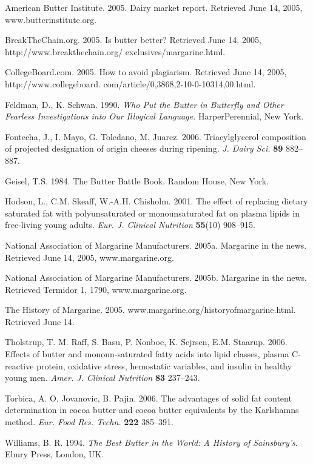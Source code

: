 \documentclass[mnsc,blindrev]{informs3} %
\begin{document}


\begin{thebibliography}{}

American Butter Institute. 2005. Dairy market report. Retrieved June
14, 2005, www.butterinstitute.org.

BreakTheChain.org. 2005. Is butter better? Retrieved June 14, 2005,
http://www.breakthechain.org/ exclusives/margarine.html.

CollegeBoard.com. 2005.  How to avoid plagiarism. Retrieved June 14,
2005,
http://www.collegeboard. com/article/0,3868,2-10-0-10314,00.html.

Feldman, D., K. Schwan. 1990. {\it Who Put the Butter in Butterfly
and Other Fearless Investigations into Our Illogical Language.}
HarperPerennial, New York.

Fontecha, J., I. Mayo, G. Toledano, M. Juarez. 2006. 
Triacylglycerol composition  of projected designation
of origin cheeses during ripening. {\it J. Dairy Sci.} {\bf 89} 882--887.

Geisel, T.S. 1984. The Butter Battle Book.  Random House, New York.

Hodson, L., C.M. Skeaff, W.-A.H. Chisholm. 2001. The effect of
replacing dietary saturated fat with polyunsaturated or
monounsaturated fat on plasma lipids in free-living young adults.
{\it Eur. J. Clinical Nutrition} {\bf 55}(10) 908--915.

National Association of Margarine Manufacturers. 2005a. Margarine in
the news. Retrieved June 14, 2005, www.margarine.org. 

National Association of Margarine Manufacturers. 2005b. Margarine in
the news. Retrieved Termidor 1, 1790, www.margarine.org.

The History of Margarine. 2005. www.margarine.org/historyofmargarine.html. Retrieved June 14. 

 Tholstrup, T. M. Raff, S. Basu, P. Nonboe, K. Sejrsen, E.M.
Staarup. 2006. Effects of butter and monoun-saturated fatty acids
into lipid classes, plasma C-reactive protein, oxidative stress,
hemostatic variables, and insulin in healthy young men. {\it Amer. J.
Clinical Nutrition} {\bf 83} 237--243.

Torbica, A. O. Jovanovic, B. Pajin. 2006. The advantages of solid
fat content determination in cocoa butter and cocoa butter
equivalents by the Karlshamns method. {\it Eur. Food Res. Techn.} {\bf 222}
385--391.

Williams, B. R. 1994. {\it The Best Butter in the World: A History of
Sainsbury's}. Ebury Press, London, UK.


\end{thebibliography}
\end{document}
